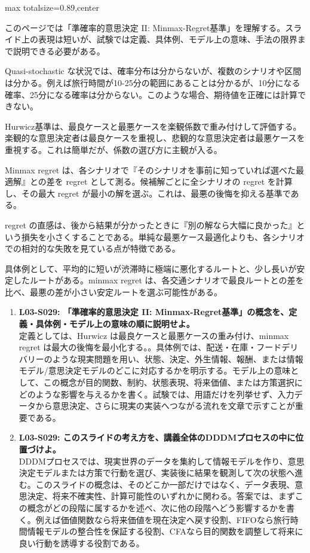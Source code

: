 \begin{minipage}[t]{0.58\textwidth}
\begin{adjustbox}{max totalsize={\textwidth}{0.89\textheight},center}
\begin{minipage}{\textwidth}\scriptsize
{}このページでは「準確率的意思決定 II: Minmax-Regret基準」を理解する。スライド上の表現は短いが、試験では定義、具体例、モデル上の意味、手法の限界まで説明できる必要がある。\par
Quasi-stochastic な状況では、確率分布は分からないが、複数のシナリオや区間は分かる。例えば旅行時間が10-25分の範囲にあることは分かるが、10分になる確率、25分になる確率は分からない。このような場合、期待値を正確には計算できない。\par
Hurwicz基準は、最良ケースと最悪ケースを楽観係数で重み付けして評価する。楽観的な意思決定者は最良ケースを重視し、悲観的な意思決定者は最悪ケースを重視する。これは簡単だが、係数の選び方に主観が入る。\par
Minmax regret は、各シナリオで『そのシナリオを事前に知っていれば選べた最適解』との差を regret として測る。候補解ごとに全シナリオの regret を計算し、その最大 regret が最小の解を選ぶ。これは、最悪の後悔を抑える基準である。\par
regret の直感は、後から結果が分かったときに『別の解なら大幅に良かった』という損失を小さくすることである。単純な最悪ケース最適化よりも、各シナリオでの相対的な失敗を見ている点が特徴である。\par
具体例として、平均的に短いが渋滞時に極端に悪化するルートと、少し長いが安定したルートがある。minmax regret は、各交通シナリオで最良ルートとの差を比べ、最悪の差が小さい安定ルートを選ぶ可能性がある。\par{}\begin{enumerate}\item \textbf{L03-S029: 「準確率的意思決定 II: Minmax-Regret基準」の概念を、定義・具体例・モデル上の意味の順に説明せよ。}\\定義としては、Hurwicz は最良ケースと最悪ケースの重み付け、minmax regret は最大の後悔を最小化する。。具体例では、配送・在庫・フードデリバリーのような現実問題を用い、状態、決定、外生情報、報酬、または情報モデル/意思決定モデルのどこに対応するかを明示する。モデル上の意味として、この概念が目的関数、制約、状態表現、将来価値、または方策選択にどのような影響を与えるかを書く。試験では、用語だけを列挙せず、入力データから意思決定、さらに現実の実装へつながる流れを文章で示すことが重要である。\item \textbf{L03-S029: このスライドの考え方を、講義全体のDDDMプロセスの中に位置づけよ。}\\DDDMプロセスでは、現実世界のデータを集約して情報モデルを作り、意思決定モデルまたは方策で行動を選び、実装後に結果を観測して次の状態へ進む。このスライドの概念は、そのどこか一部だけではなく、データ表現、意思決定、将来不確実性、計算可能性のいずれかに関わる。答案では、まずこの概念がどの段階に属するかを述べ、次に他の段階へどう影響するかを書く。例えば価値関数なら将来価値を現在決定へ戻す役割、FIFOなら旅行時間情報モデルの整合性を保証する役割、CFAなら目的関数を調整して将来に良い行動を誘導する役割である。\end{enumerate}

\end{minipage}
\end{adjustbox}
\end{minipage}

